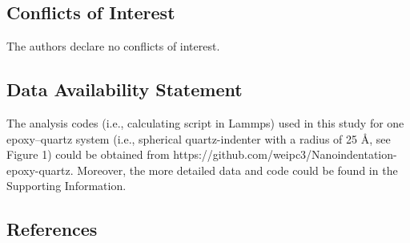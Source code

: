 \documentclass{article}
\begin{document}
\subsection*{Conflicts of Interest}
The authors declare no conflicts of interest.

\subsection*{Data Availability Statement}
The analysis codes (i.e., calculating script in Lammps) used in this study for one epoxy–quartz system (i.e., spherical quartz-indenter with a radius of 25 Å, see Figure 1) could be obtained from https://github.com/weipc3/Nanoindentation-epoxy-quartz. Moreover, the more detailed data and code could be found in the Supporting Information.

\subsection*{References}
\end{document}
